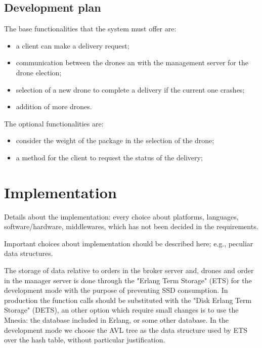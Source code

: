 \documentclass[a4paper, oneside]{memoir}
\begin{document}
\section{Development plan}
The base functionalities that the system must offer are:
\begin{itemize}
\item a client can make a delivery request;
\item communication between the drones an with the management server for the drone election;
\item selection of a new drone to complete a delivery if the current one crashes;
\item addition of more drones.
\end{itemize}
The optional functionalities are:
\begin{itemize}
\item consider the weight of the package in the selection of the drone;
\item a method for the client to request the status of the delivery;
\end{itemize}


\chapter{Implementation}

Details about the implementation: every choice about platforms, languages, software/hardware, middlewares, which has not been decided in the requirements.


Important choices about implementation should be described here; e.g., peculiar data structures.

The storage of data relative to orders in the broker server and, drones and order in the manager server is done through the "Erlang Term Storage" (ETS) for the development mode with the purpose of preventing SSD consumption. In production the function calls should be substituted with the "Disk Erlang Term Storage" (DETS), an other option which require small changes is to use the Mnesia: the database included in Erlang, or some other database. In the development mode we choose the AVL tree as the data structure used by ETS over the hash table, without particular justification.
\end{document}
